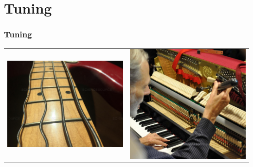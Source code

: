 \documentclass[12pt]{beamer}
\begin{document}
    \section{Tuning}
        \begin{frame}
            \frametitle{Tuning}
            \begin{center}
                \begin{tabular}{c c}
                    \includegraphics[scale=0.1]{stringvibration} & \includegraphics[scale=0.232]{pianotuning}
                \end{tabular}
            \end{center}
        \end{frame}
\end{document}
